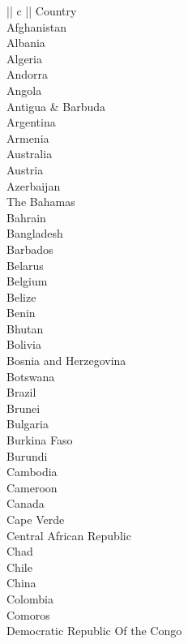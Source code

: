 \documentclass{article}
\begin{document}
\begin{center}
\begin{tabular} {|| c ||}
   Country\\ \hline 
   Afghanistan\\ \hline 
   Albania\\ \hline 
   Algeria\\ \hline 
   Andorra\\ \hline 
   Angola\\ \hline 
   Antigua & Barbuda\\ \hline 
   Argentina\\ \hline 
   Armenia\\ \hline 
   Australia\\ \hline 
   Austria\\ \hline 
   Azerbaijan\\ \hline 
   The Bahamas\\ \hline 
   Bahrain\\ \hline 
   Bangladesh\\ \hline 
   Barbados\\ \hline 
   Belarus\\ \hline 
   Belgium\\ \hline 
   Belize\\ \hline 
   Benin\\ \hline 
   Bhutan\\ \hline 
   Bolivia\\ \hline 
   Bosnia and Herzegovina\\ \hline 
   Botswana\\ \hline 
   Brazil\\ \hline 
   Brunei\\ \hline 
   Bulgaria\\ \hline 
   Burkina Faso\\ \hline 
   Burundi\\ \hline 
   Cambodia\\ \hline 
   Cameroon\\ \hline 
   Canada\\ \hline 
   Cape Verde\\ \hline 
   Central African Republic\\ \hline 
   Chad\\ \hline 
   Chile\\ \hline 
   China\\ \hline 
   Colombia\\ \hline 
   Comoros\\ \hline 
   Democratic Republic Of the Congo\\ \hline 

\end{tabular}
\end{center}
\end{document}
